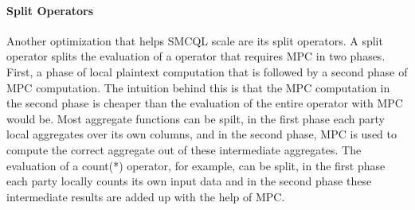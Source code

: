 \paragraph{Split Operators} %
Another optimization that helps SMCQL scale are its split operators. A split operator splits the evaluation of a operator that requires MPC in two phases. First, a phase of local plaintext computation that is followed by a second phase of MPC computation. The intuition behind this is that the MPC computation in the second phase is cheaper than the evaluation of the entire operator with MPC would be. Most aggregate functions can be spilt, in the first phase each party local aggregates over its own columns, and in the second phase, MPC is used to compute the correct aggregate out of these intermediate aggregates. The evaluation of a count(*) operator, for example, can be split, in the first phase each party locally counts its own input data and in the second phase these intermediate results are added up with the help of MPC. %



